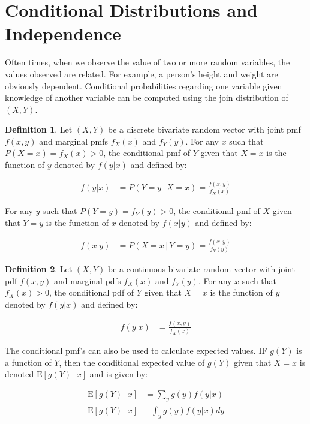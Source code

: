 \documentclass[11pt,a4paper]{report}
\theoremstyle{definition}
\newtheorem{defn}{Definition}[section]
\theoremstyle{theorem}
\begin{document}
\section{Conditional Distributions and Independence}

Often times, when we observe the value of two or more random variables, the values observed are related.  For example, a person's height and weight are obviously dependent.  Conditional probabilities regarding one variable given knowledge of another variable can be computed using the join distribution of $(X,Y)$.

\begin{defn}
  Let $(X,Y)$ be a discrete bivariate random vector with joint pmf $f(x,y)$ and marginal pmfs $f_X(x)$ and $f_Y(y)$.  For any $x$ such that $P(X = x) = f_X(x) > 0$, the conditional pmf of $Y$ given that $X = x$ is the function of $y$ denoted by $f(y|x)$ and defined by:

  \begin{align*}
    f(y|x) &= P(Y = y \, | \, X = x) = \frac{f(x,y)}{f_X(x)}
  \end{align*}

For any $y$ such that $P(Y = y) = f_Y(y) > 0$, the conditional pmf of $X$ given that $Y = y$ is the function of $x$ denoted by $f(x|y)$ and defined by:

\begin{align*}
  f(x|y) &= P(X = x \, | \, Y = y) = \frac{f(x,y)}{f_Y(y)}
\end{align*}

\end{defn}

\begin{defn}
Let $(X,Y)$ be a continuous bivariate random vector with joint pdf $f(x,y)$ and marginal pdfs $f_X(x)$ and $f_Y(y)$.  For any $x$ such that $f_X(x) > 0$, the conditional pdf of $Y$ given that $X = x$ is the function of $y$ denoted by $f(y|x)$ and defined by:

\begin{align*}
  f(y|x) &= \frac{f(x,y)}{f_X(x)}
\end{align*}

\end{defn}

The conditional pmf's can also be used to calculate expected values.  IF $g(Y)$ is a function of $Y$, then the conditional expected value of $g(Y)$ given that $X = x$ is denoted $\mathrm{E}\left[g(Y) \, | \, x \right]$ and is given by:

\begin{align*}
  \mathrm{E}\left[g(Y) \, | \, x \right] &= \sum_y g(y) f(y|x) \\
  \mathrm{E}\left[g(Y) \, | \, x \right] &- \int_y g(y) f(y|x) dy
\end{align*}
\end{document}
